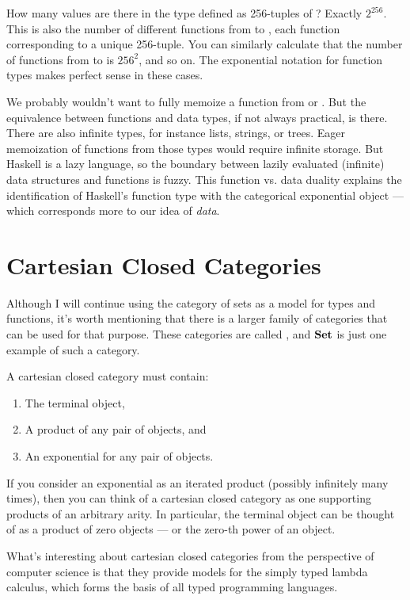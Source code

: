 How many values are there in the type defined as 256-tuples of
? Exactly $2^{256}$. This is also the number
of different functions from  to , each
function corresponding to a unique 256-tuple. You can similarly
calculate that the number of functions from  to
 is $256^{2}$, and so on. The exponential
notation for function types makes perfect sense in these cases.

We probably wouldn't want to fully memoize a function from 
or . But the equivalence between functions and data
types, if not always practical, is there. There are also infinite types,
for instance lists, strings, or trees. Eager memoization of functions
from those types would require infinite storage. But Haskell is a lazy
language, so the boundary between lazily evaluated (infinite) data
structures and functions is fuzzy. This function vs. data duality
explains the identification of Haskell's function type with the
categorical exponential object --- which corresponds more to our idea of
\emph{data}.

\section{Cartesian Closed
Categories}\label{cartesian-closed-categories}

Although I will continue using the category of sets as a model for types
and functions, it's worth mentioning that there is a larger family of
categories that can be used for that purpose. These categories are
called , and $\mathbf{Set}$ is just one example of
such a category.

A cartesian closed category must contain:

\begin{enumerate}
\tightlist
\item
  The terminal object,
\item
  A product of any pair of objects, and
\item
  An exponential for any pair of objects.
\end{enumerate}
If you consider an exponential as an iterated product (possibly
infinitely many times), then you can think of a cartesian closed
category as one supporting products of an arbitrary arity. In
particular, the terminal object can be thought of as a product of zero
objects --- or the zero-th power of an object.

What's interesting about cartesian closed categories from the
perspective of computer science is that they provide models for the
simply typed lambda calculus, which forms the basis of all typed
programming languages.

